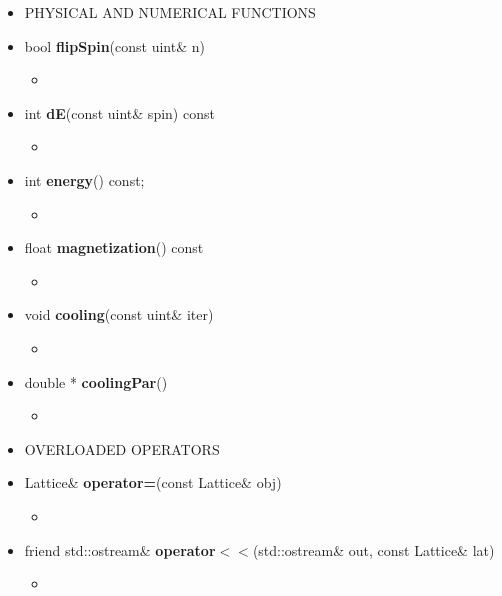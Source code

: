 \documentclass[11pt,a4paper]{article}
\begin{document}
\begin{itemize}
\begin{itemize}
		\item[] PHYSICAL AND NUMERICAL FUNCTIONS \\
 		
			\item[] bool \textbf{flipSpin}(const uint\& n)		 
			\begin{itemize}
				\item[] 
			\end{itemize}
			
			\item[] int \textbf{dE}(const uint\& spin) const		 
			\begin{itemize}
				\item[] 
			\end{itemize}
			
			\item[] int \textbf{energy}() const;		 
			\begin{itemize}
				\item[] 
			\end{itemize}
			
			\item[] float \textbf{magnetization}() const		 
			\begin{itemize}
				\item[] 
			\end{itemize}
			
			\item[] void \textbf{cooling}(const uint\& iter) 		 
			\begin{itemize}
				\item[] 
			\end{itemize}
			
			\item[] double * \textbf{coolingPar}()	 
			\begin{itemize}
				\item[] 
			\end{itemize}
		
		\item[] OVERLOADED OPERATORS \\

			\item[] Lattice\& \textbf{operator=}(const Lattice\& obj)		 
			\begin{itemize}
				\item[] 
			\end{itemize}
			
			\item[] friend std::ostream\& \textbf{operator$<<$}(std::ostream\& out, const Lattice\& lat) 		 
			\begin{itemize}
				\item[] 
			\end{itemize}	
			

\end{itemize}
\end{itemize}
\end{document}
